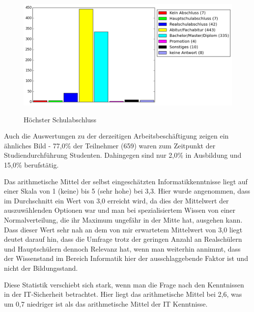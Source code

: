 \begin{figure}[H]
\centering
\includegraphics[scale=0.55]{images/schulabschluss}\\
\caption{Höchster Schulabschluss}\label{schulabschluss}
\end{figure}
Auch die Auswertungen zu der derzeitigen Arbeitsbeschäftigung zeigen ein ähnliches Bild - 77,0\% der Teilnehmer (659) waren zum Zeitpunkt der Studiendurchführung Studenten. Dahingegen sind nur 2,0\% in Ausbildung und 15,0\% berufstätig.

Das arithmetische Mittel der selbst eingeschätzten Informatikkenntnisse liegt auf einer Skala von 1 (keine) bis 5 (sehr hohe) bei 3,3. Hier wurde angenommen, dass im Durchschnitt ein Wert von 3,0 erreicht wird, da dies der Mittelwert der auszuwählenden Optionen war und man bei spezialisiertem Wissen von einer Normalverteilung, die ihr Maximum ungefähr in der Mitte hat, ausgehen kann. Dass dieser Wert sehr nah an dem von mir erwartetem Mittelwert von 3,0 liegt deutet darauf hin, dass die Umfrage trotz der geringen Anzahl an Realschülern und Hauptschülern dennoch Relevanz hat, wenn man weiterhin annimmt, dass der Wissenstand im Bereich Informatik hier der ausschlaggebende Faktor ist und nicht der Bildungsstand.

Diese Statistik verschiebt sich stark, wenn man die Frage nach den Kenntnissen in der IT-Sicherheit betrachtet. Hier liegt das arithmetische Mittel bei 2,6, was um 0,7 niedriger ist als das arithmetische Mittel der IT Kenntnisse.

